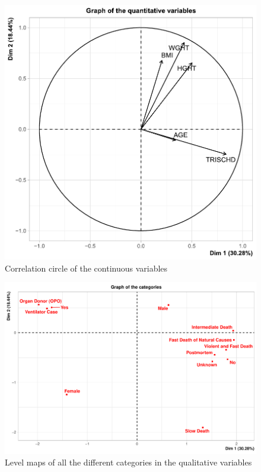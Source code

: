\documentclass[a4paper, 11pt]{article}
\begin{document}
\begin{multicols}{2}
\begin{figure}[H]
	\centering
	\includegraphics[width=\columnwidth]{figures/clinical_correlation_plots/all_quant_Dim2}
	\caption{Correlation circle of the continuous variables}
	\label{fig:corCircle}
\end{figure}

\begin{figure}[H]
	\centering
	\includegraphics[width=\columnwidth]{figures/clinical_correlation_plots/all_categ_Dim}
	\caption{Level maps of all the different categories in the qualitative variables}
	\label{fig:lvlMap}
\end{figure}


\end{multicols}
\end{document}
